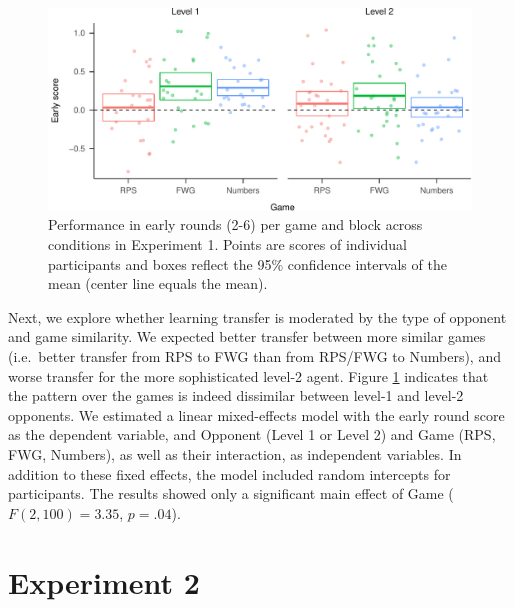 \documentclass[smallextended]{svjour3}       %
\begin{document}
\begin{figure}

{\centering \includegraphics[width=\textwidth]{CBB_v2_files/figure-latex/exp1-early-score-by-opp-1} 

}

\caption{\label{ref:figure4-caption}Performance in early rounds (2-6) per game and block across conditions in Experiment 1. Points are scores of individual participants and boxes reflect the 95\% confidence intervals of the mean (center line equals the mean).}\label{fig:exp1-early-score-by-opp}
\end{figure}

Next, we explore whether learning transfer is moderated by the type of
opponent and game similarity. We expected better transfer between more
similar games (i.e.~better transfer from RPS to FWG than from RPS/FWG to
Numbers), and worse transfer for the more sophisticated level-2 agent.
Figure \ref{fig:exp1-early-score-by-opp} indicates that the pattern over
the games is indeed dissimilar between level-1 and level-2 opponents. We
estimated a linear mixed-effects model with the early round score as the
dependent variable, and Opponent (Level 1 or Level 2) and Game (RPS,
FWG, Numbers), as well as their interaction, as independent variables.
In addition to these fixed effects, the model included random intercepts
for participants. The results showed only a significant main effect of
Game (\(F(2,100) = 3.35\), \(p = .04\)).

\hypertarget{experiment-2}{%
\section{Experiment 2}\label{experiment-2}}
\end{document}
